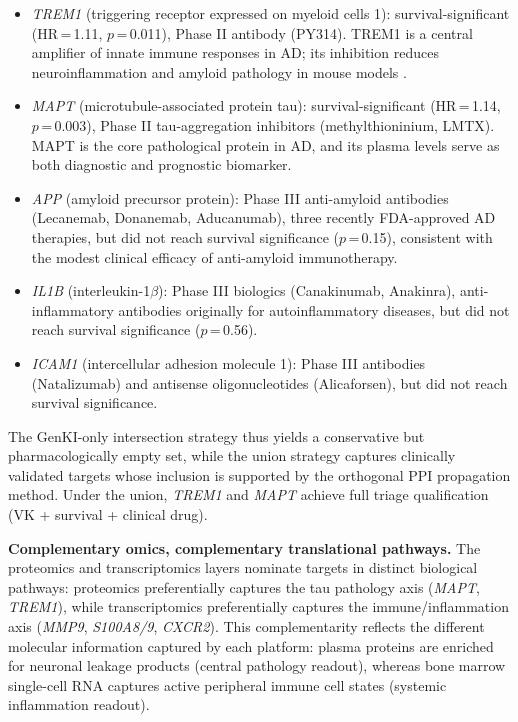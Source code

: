\documentclass[12pt,a4paper]{article}
\begin{document}
\begin{itemize}
\item \textit{TREM1} (triggering receptor expressed on myeloid cells 1): survival-significant (HR\,=\,1.11, $p$\,=\,0.011), Phase II antibody (PY314). TREM1 is a central amplifier of innate immune responses in AD; its inhibition reduces neuroinflammation and amyloid pathology in mouse models \citep{trem1review2024}.
\item \textit{MAPT} (microtubule-associated protein tau): survival-significant (HR\,=\,1.14, $p$\,=\,0.003), Phase II tau-aggregation inhibitors (methylthioninium, LMTX). MAPT is the core pathological protein in AD, and its plasma levels serve as both diagnostic and prognostic biomarker.
\item \textit{APP} (amyloid precursor protein): Phase III anti-amyloid antibodies (Lecanemab, Donanemab, Aducanumab), three recently FDA-approved AD therapies, but did not reach survival significance ($p$\,=\,0.15), consistent with the modest clinical efficacy of anti-amyloid immunotherapy.
\item \textit{IL1B} (interleukin-1$\beta$): Phase III biologics (Canakinumab, Anakinra), anti-inflammatory antibodies originally for autoinflammatory diseases, but did not reach survival significance ($p$\,=\,0.56).
\item \textit{ICAM1} (intercellular adhesion molecule 1): Phase III antibodies (Natalizumab) and antisense oligonucleotides (Alicaforsen), but did not reach survival significance.
\end{itemize}

The GenKI-only intersection strategy thus yields a conservative but pharmacologically empty set, while the union strategy captures clinically validated targets whose inclusion is supported by the orthogonal PPI propagation method. Under the union, \textit{TREM1} and \textit{MAPT} achieve full triage qualification (VK + survival + clinical drug).

\textbf{Complementary omics, complementary translational pathways.}
The proteomics and transcriptomics layers nominate targets in distinct biological pathways: proteomics preferentially captures the tau pathology axis (\textit{MAPT}, \textit{TREM1}), while transcriptomics preferentially captures the immune/inflammation axis (\textit{MMP9}, \textit{S100A8/9}, \textit{CXCR2}). This complementarity reflects the different molecular information captured by each platform: plasma proteins are enriched for neuronal leakage products (central pathology readout), whereas bone marrow single-cell RNA captures active peripheral immune cell states (systemic inflammation readout).
\end{document}
